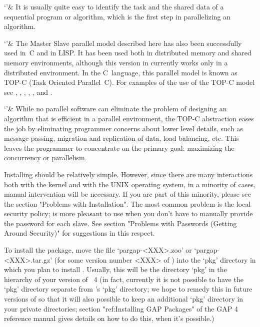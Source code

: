 `'& It is usually quite easy to identify the task and the shared data  of
    a sequential program  or  algorithm,  which  is  the  first  step  in
    parallelizing an algorithm.

`'& The  Master  Slave  parallel  model  described  here  has  also  been
    successfully used in~C  and  in  LISP.  It  has  been  used  both  in
    distributed memory and  shared  memory  environments,  although  this
    version in {\GAP} currently works only in a distributed  environment.
    In the C~language, this  parallel  model  is  known  as  TOP-C  (Task
    Oriented Parallel~C). For examples of the use of the TOP-C model  see
    \cite{Coo98},     \cite{CFTY94},     \cite{CH97},      \cite{CHLM97},
    \cite{CLMW96}, and \cite{CT96}.

`'& While no parallel software can eliminate the problem of designing  an
    algorithm that is efficient in  a  parallel  environment,  the  TOP-C
    abstraction eases the job by eliminating  programmer  concerns  about
    lower  level  details,  such  as  message  passing,   migration   and
    replication of data, load balancing, etc. This leaves the  programmer
    to concentrate on the primary goal:  maximizing  the  concurrency  or
    parallelism.

\enditems


Installing {\ParGAP} should be relatively simple.  However,  since  there
are many interactions both with the  {\GAP}  kernel  and  with  the  UNIX
operating system, in a minority of cases,  manual  intervention  will  be
necessary. If you are part of  this  minority,  please  see  the  section
"Problems with Installation".  The  most  common  problem  is  the  local
security policy; {\ParGAP} is more pleasant to use when you don't have to
manually provide the password for each slave. See section "Problems  with
Passwords (Getting Around Security)" for suggestions in this respect.

To install the {\ParGAP} package, move  the  file  `pargap-<XXX>.zoo'  or
`pargap-<XXX>.tar.gz' (for some version number <XXX> of  {\ParGAP})  into
the `pkg' directory in which you plan to install {\ParGAP}. Usually, this
will be the directory `pkg' in the hierarchy of your version of  {\GAP}~4
(in fact, currently it is  not  possible  to  have  the  `pkg'  directory
separate from {\GAP}'s `pkg' directory; we hope to remedy this in  future
versions of {\ParGAP} so that it will also possible to keep an additional
`pkg' directory in your private directories; section "ref:Installing  GAP
Packages" of the GAP 4 reference manual gives details on how to do  this,
when it's possible.)

